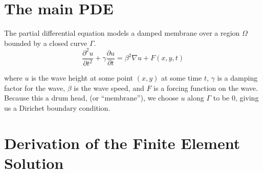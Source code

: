 \documentclass[a4paper,12pt]{article}
\begin{document}
\section{The main PDE}
The partial differential equation models a damped membrane over a region $\Omega$ bounded by a closed curve $\Gamma$.
\begin{equation} \label{eq:main_pde}
\frac{\partial^2u}{\partial t^2} + \gamma \frac{\partial u}{\partial t}
=
\beta^2 \nabla u + F(x,y,t)
\end{equation}

where $u$ is the wave height at some point $(x,y)$ at some time $t$, $\gamma$ is a damping factor for the wave,
$\beta$ is the wave speed, and $F$ is a forcing function on the wave. Because this a drum head, (or ``membrane''), we choose
$u$ along $\Gamma$ to be 0, giving us a Dirichet boundary condition.

\section{Derivation of the Finite Element Solution}
\end{document}
